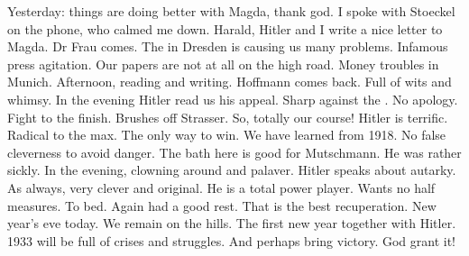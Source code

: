 Yesterday: things are doing better with Magda, thank god. I spoke with Stoeckel on the phone, who calmed me down. Harald, Hitler and I write a nice letter to Magda. Dr Frau comes. The  in Dresden is causing us many problems. Infamous press agitation. Our papers are not at all on the high road. Money troubles in Munich. Afternoon, reading and writing. Hoffmann comes back. Full of wits and whimsy. In the evening Hitler read us his appeal. Sharp against the . No apology. Fight to the finish. Brushes off Strasser. So, totally our course! Hitler is terrific. Radical to the max. The only way to win. We have learned from 1918. No false cleverness to avoid danger. The bath here is good for Mutschmann. He was rather sickly. In the evening, clowning around and palaver. Hitler speaks about autarky. As always, very clever and original. He is a total power player. Wants no half measures. To bed.  Again had a good rest. That is the best recuperation. New year's eve today. We remain on the hills. The first new year together with Hitler. 1933 will be full of crises and struggles. And perhaps bring victory. God grant it!

